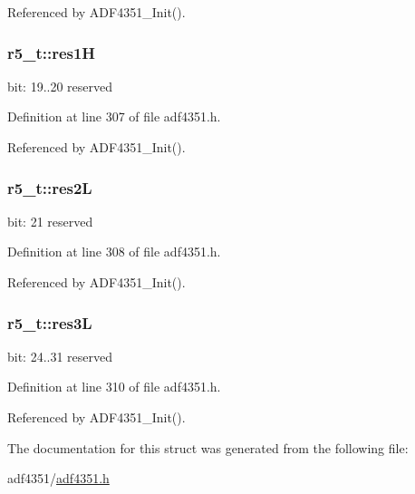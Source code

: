 Referenced by A\+D\+F4351\+\_\+\+Init().

\subsubsection[{\texorpdfstring{res1H}{res1H}}]{ r5\+\_\+t\+::res1H}\hypertarget{structr5__t_ac2077b2cbd35a25d80a3b485aeeeca16}{}\label{structr5__t_ac2077b2cbd35a25d80a3b485aeeeca16}
bit\+: 19..20 reserved 

Definition at line 307 of file adf4351.\+h.



Referenced by A\+D\+F4351\+\_\+\+Init().

\subsubsection[{\texorpdfstring{res2L}{res2L}}]{ r5\+\_\+t\+::res2L}\hypertarget{structr5__t_ad6a330a8f3ac938062893adae1547ad2}{}\label{structr5__t_ad6a330a8f3ac938062893adae1547ad2}
bit\+: 21 reserved 

Definition at line 308 of file adf4351.\+h.



Referenced by A\+D\+F4351\+\_\+\+Init().

\subsubsection[{\texorpdfstring{res3L}{res3L}}]{ r5\+\_\+t\+::res3L}\hypertarget{structr5__t_a4b3d74a8e15b3a85981a8cc7fe4c26b4}{}\label{structr5__t_a4b3d74a8e15b3a85981a8cc7fe4c26b4}
bit\+: 24..31 reserved 

Definition at line 310 of file adf4351.\+h.



Referenced by A\+D\+F4351\+\_\+\+Init().



The documentation for this struct was generated from the following file\+:\begin{DoxyCompactItemize}
\item 
adf4351/\hyperlink{adf4351_8h}{adf4351.\+h}\end{DoxyCompactItemize}
